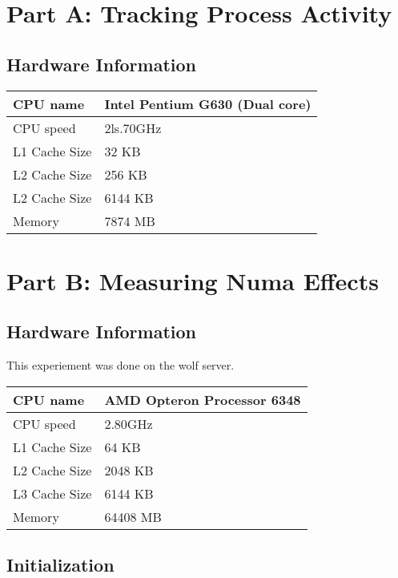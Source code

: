 \documentclass{article}
\begin{document}
\section{Part A: Tracking Process Activity}
\subsection{Hardware Information}


\begin{center}
\begin{tabular}{|l|l|}
  	\hline
  	CPU name & Intel Pentium G630 (Dual core)\\ \hline
  	CPU speed & 2ls.70GHz \\ \hline
  	L1 Cache Size & 32 KB \\ \hline
	L2 Cache Size & 256 KB \\ \hline
	L2 Cache Size & 6144 KB \\ \hline
	Memory & 7874 MB \\ \hline
\end{tabular}
\end{center}


\section{Part B: Measuring Numa Effects}
\subsection{Hardware Information}

This experiement was done on the wolf server.

\begin{center}
\begin{tabular}{|l|l|}
  	\hline
  	CPU name & AMD Opteron Processor 6348\\ \hline
  	CPU speed & 2.80GHz \\ \hline
  	L1 Cache Size & 64 KB \\ \hline
	L2 Cache Size & 2048 KB \\ \hline
	L3 Cache Size & 6144 KB \\ \hline
	Memory & 64408 MB \\ \hline
\end{tabular}
\end{center}

\subsection{Initialization}
\end{document}
